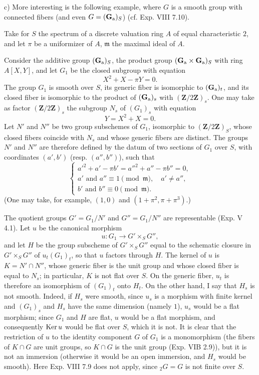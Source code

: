 \noindent c) More interesting is the following example, where $G$ is a smooth group with connected fibers (and even $G=(\mathbf{G}_{\mathrm{a}})_S$) (cf. Exp. VIII 7.10).

Take for $S$ the spectrum of a discrete valuation ring $A$ of equal characteristic $2$, and let $\pi$ be a uniformizer of $A$, $\mathfrak m$ the maximal ideal of $A$.

Consider the additive group $(\mathbf{G}_{\mathrm{a}})_S$, the product group $(\mathbf{G}_{\mathrm{a}}\times\mathbf{G}_{\mathrm{a}})_S$ with ring $A[X,Y]$, and let $G_1$ be the closed subgroup with equation
\[
X^2+X-\pi Y=0.\tag{1}
\]
The group $G_1$ is smooth over $S$, its generic fiber is isomorphic to $(\mathbf{G}_{\mathrm{a}})_t$, and its closed fiber is isomorphic to the product of $(\mathbf{G}_{\mathrm{a}})_s$ with $(\mathbf Z/2\mathbf Z)_s$. One may take as factor $(\mathbf Z/2\mathbf Z)_s$ the subgroup $N_s$ of $(G_1)_s$ with equation
\[
Y=X^2+X=0.\tag{2}
\]
Let $N'$ and $N''$ be two group subschemes of $G_1$, isomorphic to $(\mathbf Z/2\mathbf Z)_S$, whose closed fibers coincide with $N_s$ and whose generic fibers are distinct. The groups $N'$ and $N''$ are therefore defined by the datum of two sections of $G_1$ over $S$, with coordinates $(a',b')$ (resp. $(a'',b'')$), such that
\[
\begin{cases}
a'^2+a'-\pi b'=a''^2+a''-\pi b''=0,\\
a'\text{ and }a''\equiv1\pmod{\mathfrak m},\quad a'\ne a'',\\
b'\text{ and }b''\equiv0\pmod{\mathfrak m}.
\end{cases}\tag{3}
\]
(One may take, for example, $(1,0)$ and $(1+\pi^2,\pi+\pi^3)$.)

The quotient groups $G'=G_1/N'$ and $G''=G_1/N''$ are representable (Exp. V 4.1). Let $u$ be the canonical morphism
\[
u:G_1\longrightarrow G'\times_S G'',
\]
and let $H$ be the group subscheme of $G'\times_S G''$ equal to the schematic closure in $G'\times_S G''$ of $u_t(G_1)_t$, so that $u$ factors through $H$. The kernel of $u$ is $K=N'\cap N''$, whose generic fiber is the unit group and whose closed fiber is equal to $N_s$; in particular, $K$ is not flat over $S$. On the generic fiber, $u_t$ is therefore an isomorphism of $(G_1)_t$ onto $H_t$. On the other hand, I say that $H_s$ is not smooth. Indeed, if $H_s$ were smooth, since $u_s$ is a morphism with finite kernel and $(G_1)_s$ and $H_s$ have the same dimension (namely $1$), $u_s$ would be a flat morphism; since $G_1$ and $H$ are flat, $u$ would be a flat morphism, and consequently $\operatorname{Ker} u$ would be flat over $S$, which it is not. It is clear that the restriction of $u$ to the identity component $G$ of $G_1$ is a monomorphism (the fibers of $K\cap G$ are unit groups, so $K\cap G$ is the unit group (Exp. VIB 2.9)), but it is not an immersion (otherwise it would be an open immersion, and $H_s$ would be smooth). Here Exp. VIII 7.9 does not apply, since ${}_2G=G$ is not finite over $S$.

